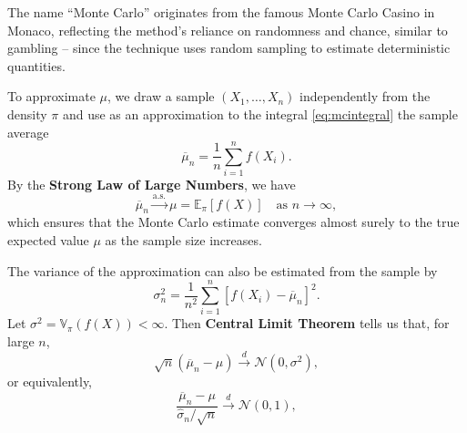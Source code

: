 The name ``Monte Carlo'' originates from the famous Monte Carlo Casino in Monaco, reflecting the method’s reliance on randomness and chance, similar to gambling -- since the technique uses random sampling to estimate deterministic quantities.

To approximate $\mu$, we draw a sample $(X_1, \ldots, X_n)$ independently from the density $\pi$ and use as an approximation to the integral \eqref{eq:mcintegral} the sample average
\begin{equation*}
    \overline{\mu}_n = \frac{1}{n} \sum_{i=1}^n f(X_i).
\end{equation*}
%
By the \textbf{Strong Law of Large Numbers}, we have
\begin{equation*}
    \overline{\mu}_n \xrightarrow{\text{a.s.}} \mu = \mathbb{E}_\pi[f(X)] \quad \text{as } n \to \infty,
\end{equation*}
which ensures that the Monte Carlo estimate converges almost surely to the true expected value $\mu$ as the sample size increases.



The variance of the approximation can also be estimated from the sample by 
\begin{equation*}
    \sigma_n^2 = \frac{1}{n^2} \sum_{i=1}^n [f(X_i) - \overline{\mu}_n]^2.    
\end{equation*}
Let $\sigma^2 = \mathbb{V}_\pi(f(X)) < \infty$. Then \textbf{Central Limit Theorem} tells us that, for large $n$,
\begin{equation*}
    \sqrt{n}(\overline{\mu}_n - \mu) \xrightarrow{d} \mathcal{N}(0, \sigma^2),
\end{equation*}
or equivalently,
\begin{equation*}
    \frac{\overline{\mu}_n - \mu}{\hat{\sigma}_n / \sqrt{n}} \xrightarrow{d} \mathcal{N}(0, 1),
\end{equation*}


